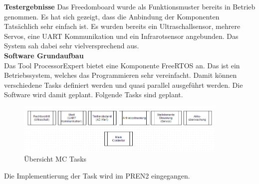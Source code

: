 \textbf{Testergebnisse}
Das Freedomboard wurde als Funktionsmuster bereits in Betrieb genommen. Es hat sich gezeigt, dass die Anbindung der Komponenten Tatsächlich sehr einfach ist. Es wurden bereits ein Ultraschallsensor, mehrere Servos, eine UART Kommunikation und ein Infrarotsensor angebunden. Das System sah dabei sehr vielversprechend aus.\\[0.2cm]
\textbf{Software Grundaufbau}\\[0.2cm]
Das Tool ProcessorExpert bietet eine Komponente FreeRTOS an. Das ist ein Betriebssystem, welches das Programmieren sehr vereinfacht. Damit können verschiedene Tasks definiert werden und quasi parallel ausgeführt werden. Die Software wird damit geplant. Folgende Tasks sind geplant.
\begin{figure}[h]
	\centering
	\includegraphics[width=0.9\textwidth]{03_Loesungskonzept/pictures/MC_Tasks.png}
	\caption{Übersicht MC Tasks}
\end{figure}
Die Implementierung der Task wird im PREN2 eingegangen.